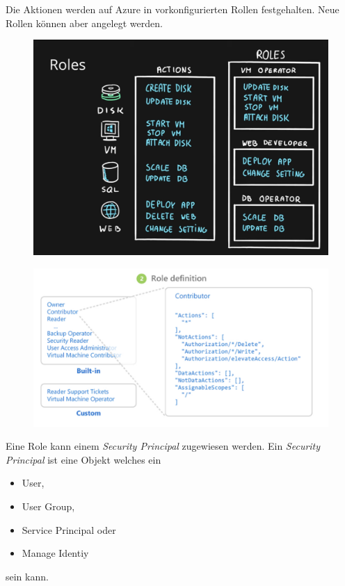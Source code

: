 Die Aktionen werden auf Azure in vorkonfigurierten Rollen festgehalten. Neue Rollen können aber angelegt werden.
\begin{figure}[H]
	\centering
	\includegraphics[scale = 0.2]{attachment/chapter_2/Scc120}
\end{figure}

\begin{figure}[H]
	\centering
	\includegraphics[scale = 0.2]{attachment/chapter_2/Scc123}
\end{figure}

Eine Role kann einem \textit{Security Principal} zugewiesen werden. Ein \textit{Security Principal} ist eine Objekt welches ein
\begin{itemize}
	\item User,
	\item User Group,
	\item Service Principal oder 
	\item Manage Identiy
\end{itemize}
sein kann.


